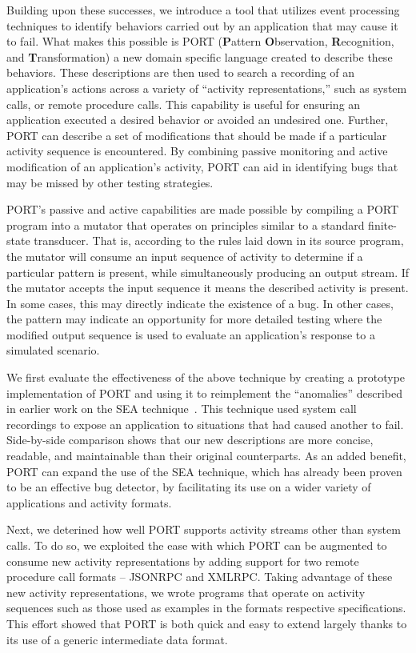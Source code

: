 Building upon these successes,
we introduce a tool
that utilizes event processing techniques
to identify
behaviors carried out by an application
that may cause it to fail.
What makes this possible is PORT
(\textbf{P}attern \textbf{O}bservation, \textbf{R}ecognition, and
\textbf{T}ransformation)
a new domain specific language
created to describe these behaviors.
These descriptions are then used
to search a recording of an application's actions
across a variety of ``activity representations,''
such as system calls,
or remote procedure calls.
This capability is useful
for ensuring an application executed a desired behavior
or avoided an undesired one.
Further, PORT can describe
a set of modifications
that should be made
if a particular activity sequence is encountered.
By combining passive monitoring and active modification
of an application's activity,
PORT can aid in identifying bugs
that may be missed by other testing strategies.

PORT's passive and active capabilities are made possible
by compiling a PORT program
into a mutator
that operates on principles similar
to a standard finite-state transducer.
That is,
according to the rules laid down in its source program,
the mutator will consume an input sequence of activity
to determine if a particular pattern is present,
while simultaneously producing an output stream.
If the mutator accepts the input sequence
it means the described activity is present.
In some cases,
this may directly indicate
the existence of a bug.
In other cases,
the pattern may
indicate an opportunity
for more detailed testing
where the modified output sequence is used
to evaluate an application's response to a simulated scenario.

We first evaluate the effectiveness of the above technique
by creating a prototype implementation of PORT
and using it to
reimplement the ``anomalies''
described in earlier work on the SEA technique~\cite{DBLP:conf/issre/MooreCFW19}.
This technique used system call recordings
to expose an application to situations that had caused another to fail.
Side-by-side comparison shows that our new
descriptions are more concise,
readable,
and maintainable
than their original counterparts.
As an added benefit,
PORT can expand the use of the SEA technique,
which has already been proven
to be an effective bug detector,
by facilitating its use
on a wider variety of applications and activity formats.

Next, we
deterined how well PORT
supports activity streams
other than system calls.
To do so,
we exploited the ease with which
PORT can be augmented
to consume new activity representations
by adding support for two remote procedure call formats -- JSONRPC and XMLRPC.
Taking advantage of these new activity representations,
we wrote programs that operate on activity sequences such as those
used as examples in the formats respective specifications.
This effort
showed that PORT is both quick and easy to extend largely thanks to its
use of a generic intermediate data format.

